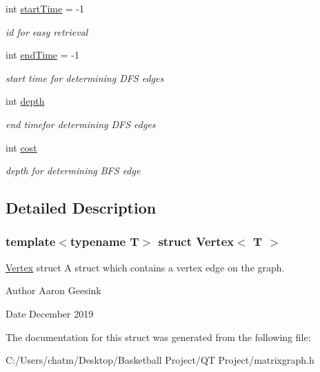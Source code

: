\begin{DoxyCompactItemize}
\mbox{\label{struct_vertex_a0f5d9fb30bc48865404bb3eec12fa7ae}} 
int \mbox{\hyperlink{struct_vertex_a0f5d9fb30bc48865404bb3eec12fa7ae}{start\+Time}} = -\/1
\begin{DoxyCompactList}\small\item\em id for easy retrieval \end{DoxyCompactList}\item 
\mbox{\label{struct_vertex_a1c9fb387b385533f8122caab375036de}} 
int \mbox{\hyperlink{struct_vertex_a1c9fb387b385533f8122caab375036de}{end\+Time}} = -\/1
\begin{DoxyCompactList}\small\item\em start time for determining D\+FS edges \end{DoxyCompactList}\item 
\mbox{\label{struct_vertex_a31fd999c51f1b0ffe2a1a8fd38834ece}} 
int \mbox{\hyperlink{struct_vertex_a31fd999c51f1b0ffe2a1a8fd38834ece}{depth}}
\begin{DoxyCompactList}\small\item\em end timefor determining D\+FS edges \end{DoxyCompactList}\item 
\mbox{\label{struct_vertex_ab10db869359e6b61729af7829f274f54}} 
int \mbox{\hyperlink{struct_vertex_ab10db869359e6b61729af7829f274f54}{cost}}
\begin{DoxyCompactList}\small\item\em depth for determining B\+FS edge \end{DoxyCompactList}\end{DoxyCompactItemize}


\subsection{Detailed Description}
\subsubsection*{template$<$typename T$>$\newline
struct Vertex$<$ T $>$}

\mbox{\hyperlink{struct_vertex}{Vertex}} struct A struct which contains a vertex edge on the graph. 

\begin{DoxyAuthor}{Author}
Aaron Geesink 
\end{DoxyAuthor}
\begin{DoxyDate}{Date}
December 2019 
\end{DoxyDate}


The documentation for this struct was generated from the following file\+:\begin{DoxyCompactItemize}
\item 
C\+:/\+Users/chatm/\+Desktop/\+Basketball Project/\+Q\+T Project/matrixgraph.\+h\end{DoxyCompactItemize}
